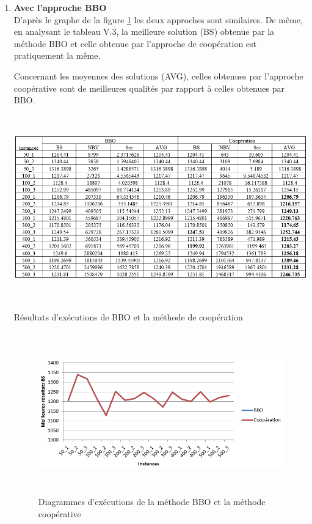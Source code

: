 \begin{enumerate}[label=\alph*)]
	\item \textbf{Avec l’approche BBO}\\
D’après le graphe de la figure \ref{fig:DEMBBOMC} les deux approches sont similaires. De même, en analysant le tableau V.3, la meilleure solution (BS) obtenue par la méthode BBO et celle obtenue par l’approche de coopération est pratiquement  la même.

Concernant les moyennes des solutions (AVG), celles obtenues par l’approche coopérative sont de meilleures qualités par rapport à celles obtenues par BBO.

\begin{table}[H]
	\includegraphics[width=15cm,height=8cm]{Chap5/t3.png}
	\caption{Résultats d’exécutions de BBO et la méthode de coopération}
	\label{tab:3}
\end{table}

\begin{figure}[H]
	\centering
	\includegraphics[width=16cm,height=7cm]{Chap5/3.png}
	\caption{Diagrammes d’exécutions de la méthode BBO et la méthode coopérative}
	\label{fig:DEMBBOMC}
\end{figure}


\end{enumerate}
